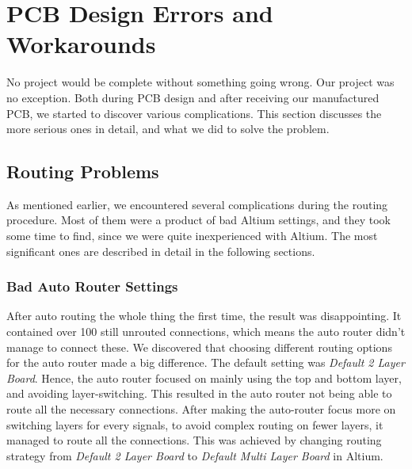 \section{PCB Design Errors and Workarounds}
No project would be complete without something going wrong. Our project was no exception. Both during PCB design and after receiving our manufactured PCB, we started to discover various complications. This section discusses the more serious ones in detail, and what we did to solve the problem.

\subsection{Routing Problems}
\label{Routing Problems}
As mentioned earlier, we encountered several complications during the routing procedure. Most of them were a product of bad Altium settings, and they took some time to find, since we were quite inexperienced with Altium.
The most significant ones are described in detail in the following sections.

\subsubsection{Bad Auto Router Settings}
After auto routing the whole thing the first time, the result was disappointing. It contained over 100 still unrouted connections, which means the auto router didn't manage to connect these.
\newline
\newline
We discovered that choosing different routing options for the auto router made a big difference. The default setting was \emph{Default 2 Layer Board}. Hence, the auto router focused on mainly using the top and bottom layer, and avoiding layer-switching. This resulted in the auto router not being able to route all the necessary connections.
\newline
\newline
After making the auto-router focus more on switching layers for every signals, to avoid complex routing on fewer layers, it managed to route all the connections. This was achieved by changing routing strategy from \emph{Default 2 Layer Board} to \emph{Default Multi Layer Board} in Altium.

